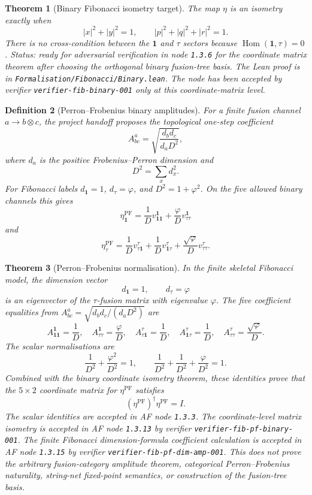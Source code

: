 \documentclass[11pt]{article}
\newtheorem{definition}{Definition}[section]
\newtheorem{theorem}[definition]{Theorem}
\DeclareMathOperator{\Hom}{Hom}
\begin{document}
\begin{theorem}[Binary Fibonacci isometry target]
The map \(\eta\) is an isometry exactly when
\[
|x|^2+|y|^2=1,\qquad |p|^2+|q|^2+|r|^2=1.
\]
There is no cross-condition between the \(\mathbf 1\) and \(\tau\) sectors
because \(\Hom(\mathbf 1,\tau)=0\). Status: ready for adversarial
verification in node \texttt{1.3.6} for the coordinate matrix theorem after
choosing the orthogonal binary fusion-tree basis. The Lean proof is in
\texttt{Formalisation/Fibonacci/Binary.lean}. The node has been accepted by
verifier \texttt{verifier-fib-binary-001} only at this coordinate-matrix
level.
\end{theorem}

\begin{definition}[Perron--Frobenius binary amplitudes]
For a finite fusion channel \(a\to b\otimes c\), the project handoff proposes
the topological one-step coefficient
\[
A^a_{bc}=\sqrt{\frac{d_b d_c}{d_aD^2}},
\]
where \(d_a\) is the positive Frobenius--Perron dimension and
\[
D^2=\sum_x d_x^2.
\]
For Fibonacci labels \(d_{\mathbf 1}=1\), \(d_\tau=\varphi\), and
\(D^2=1+\varphi^2\). On the five allowed binary channels this gives
\[
\eta_{\mathbf 1}^{\mathrm{PF}}=
\frac1D v^{\mathbf 1}_{\mathbf 1\mathbf 1}
+\frac{\varphi}{D}v^{\mathbf 1}_{\tau\tau}
\]
and
\[
\eta_\tau^{\mathrm{PF}}=
\frac1D v^\tau_{\tau\mathbf 1}
+\frac1D v^\tau_{\mathbf 1\tau}
+\frac{\sqrt\varphi}{D}v^\tau_{\tau\tau}.
\]
\end{definition}

\begin{theorem}[Perron--Frobenius normalisation]
In the finite skeletal Fibonacci model, the dimension vector
\[
d_{\mathbf 1}=1,\qquad d_\tau=\varphi
\]
is an eigenvector of the \(\tau\)-fusion matrix with eigenvalue \(\varphi\).
The five coefficient equalities from
\(A^a_{bc}=\sqrt{d_b d_c/(d_aD^2)}\) are
\[
A^{\mathbf 1}_{\mathbf 1\mathbf 1}=\frac1D,\quad
A^{\mathbf 1}_{\tau\tau}=\frac{\varphi}{D},\quad
A^\tau_{\tau\mathbf 1}=\frac1D,\quad
A^\tau_{\mathbf 1\tau}=\frac1D,\quad
A^\tau_{\tau\tau}=\frac{\sqrt\varphi}{D}.
\]
The scalar normalisations are
\[
\frac{1}{D^2}+\frac{\varphi^2}{D^2}=1,\qquad
\frac1{D^2}+\frac1{D^2}+\frac{\varphi}{D^2}=1.
\]
Combined with the binary coordinate isometry theorem, these identities prove
that the \(5\times 2\) coordinate matrix for
\(\eta^{\mathrm{PF}}\) satisfies
\[
(\eta^{\mathrm{PF}})^\dagger\eta^{\mathrm{PF}}=I.
\]
The scalar identities are accepted in AF node \texttt{1.3.3}. The
coordinate-level matrix isometry is accepted in AF node \texttt{1.3.13} by
verifier \texttt{verifier-fib-pf-binary-001}. The finite Fibonacci
dimension-formula coefficient calculation is accepted in AF node
\texttt{1.3.15} by verifier
\texttt{verifier-fib-pf-dim-amp-001}. This does not prove the arbitrary
fusion-category amplitude theorem, categorical Perron--Frobenius naturality,
string-net fixed-point semantics, or construction of the fusion-tree basis.
\end{theorem}
\end{document}

